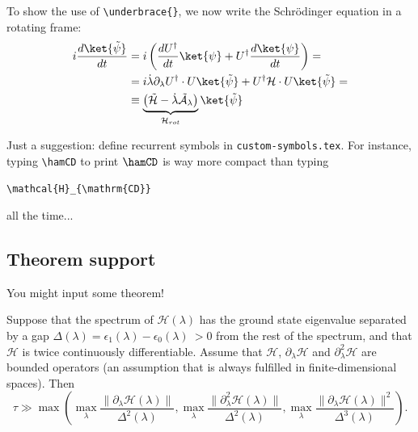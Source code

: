 To show the use of \verb|\underbrace{}|, we now write the Schrödinger equation in a rotating frame:
\begin{align}
    i\frac{d\ket{\tilde{\psi}}}{dt} &= i\left( \frac{dU^\dag}{dt}\ket{\psi} + U^\dag \frac{d\ket{\psi}}{dt} \right) = \nonumber\\
    &= i\dot\lambda \partial_\lambda U^\dag \cdot U\ket{\tilde{\psi}} + U^\dag\mathcal{H}\cdot U\ket{\tilde{\psi}} =\nonumber\\
    & \equiv \underbrace{\left( \tilde{\mathcal{H}} - \dot\lambda \tilde{\mathcal{A}}_\lambda \right)}_{\mathcal{H}_{rot}}\ket{\tilde{\psi}} \label{eq:schr-movingframe}
\end{align}

Just a suggestion: define recurrent symbols in \texttt{custom-symbols.tex}. For instance, typing \verb|\hamCD| to print $\hamCD$ is way more compact than typing
\begin{center}
    \verb|\mathcal{H}_{\mathrm{CD}}|
\end{center}
all the time...





\subsection{Theorem support}

You might input some theorem!

\begin{theorem}
Suppose that the spectrum of $\mathcal{H}(\lambda)$ has the ground state eigenvalue separated by a gap $\Delta(\lambda)=\epsilon_1(\lambda)-\epsilon_0(\lambda)\ >0$ from the rest of the spectrum, and that $\mathcal{H}$ is twice continuously differentiable. Assume that $\mathcal{H}$, $\partial_\lambda\mathcal{H}$ and $\partial^2_\lambda\mathcal{H}$ are bounded operators (an assumption that is always fulfilled in finite-dimensional spaces). Then
\begin{equation}
    \tau \gg \max\left(
        \max_\lambda \frac{\|\partial_\lambda\mathcal{H}(\lambda)\|}{\Delta^2(\lambda)},
        \max_\lambda \frac{\|\partial^2_\lambda\mathcal{H}(\lambda)\|}{\Delta^2(\lambda)}, 
        \max_\lambda \frac{\|\partial_\lambda\mathcal{H}(\lambda)\|^2}{\Delta^3(\lambda)}
    \right) .
\end{equation}
\end{theorem}








